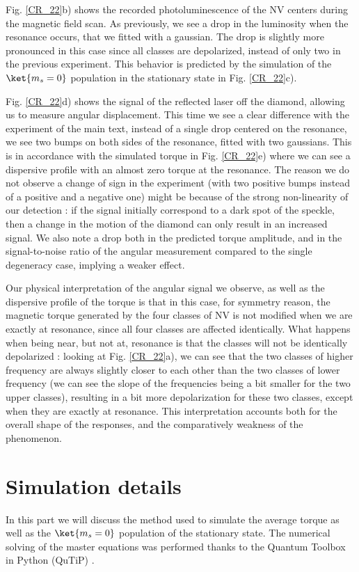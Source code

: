 \documentclass[preprintnumbers,amsmath,amssymb,onecolumn,12pt]{revtex4}
\begin{document}
Fig. \ref{CR_22}b) shows the recorded photoluminescence of the NV centers during the magnetic field scan. As previously, we see a drop in the luminosity when the resonance occurs, that we fitted with a gaussian. The drop is slightly more pronounced in this case since all classes are depolarized, instead of only two in the previous experiment. This behavior is predicted by the simulation of the $\ket{m_s=0}$ population in the stationary state in Fig. \ref{CR_22}c).

Fig. \ref{CR_22}d) shows the signal of the reflected laser off the diamond, allowing us to measure angular displacement. This time we see a clear difference with the experiment of the main text, instead of a single drop centered on the resonance, we see two bumps on both sides of the resonance, fitted with two gaussians.
This is in accordance with the simulated torque in Fig. \ref{CR_22}e) where we can see a dispersive profile with an almost zero torque at the resonance. The reason we do not observe a change of sign in the experiment (with two positive bumps instead of a positive and a negative one) might be because of the strong non-linearity of our detection : if the signal initially correspond to a dark spot of the speckle, then a change in the motion of the diamond can only result in an increased signal. We also note a drop both in the predicted torque amplitude, and in the signal-to-noise ratio  of the angular measurement compared to the single degeneracy case, implying a weaker effect.

Our physical interpretation of the angular signal we observe, as well as the dispersive profile of the torque is that in this case, for symmetry reason, the magnetic torque generated by the four classes of NV is not modified when we are exactly at resonance, since all four classes are affected identically. What happens when being near, but not at, resonance is that the classes will not be identically depolarized : looking at Fig. \ref{CR_22}a), we can see that the two classes of higher frequency are always slightly closer to each other than the two classes of lower frequency (we can see the slope of the frequencies being a bit smaller for the two upper classes), resulting in a bit more depolarization for these two classes, except when they are exactly at resonance. This interpretation accounts both for the overall shape of the responses, and the comparatively weakness of the phenomenon.


\section{Simulation details}
\label{Simu}
In this part we will discuss the method used to simulate the average torque as well as the $\ket{m_s=0}$ population of the stationary state. The numerical solving of the master equations was performed thanks to the Quantum Toolbox in Python (QuTiP) \citep{qutip1} \citep{qutip2}.
\end{document}
